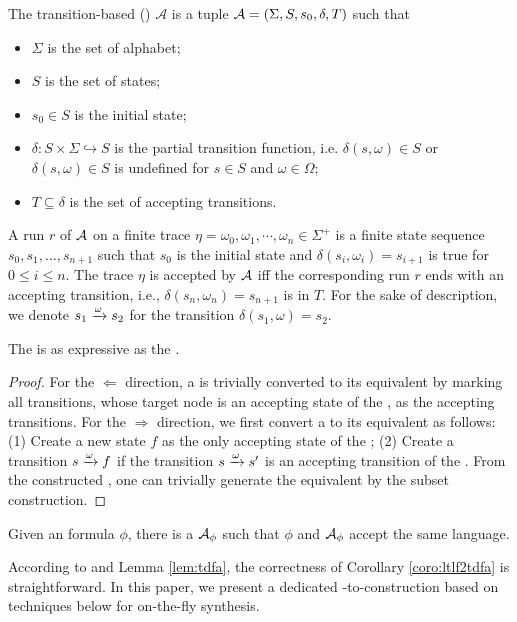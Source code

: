 \begin{definition}\label{def:tdfa}
The transition-based \dfa (\tdfa) $\mathcal{A}$ is a tuple $\mathcal{A} = (\Sigma,S,s_0,\delta,T)$ such that 
\begin{itemize}
    \item $\Sigma$ is the set of alphabet;
    \item $S$ is the set of states;
    \item $s_0\in S$ is the initial state;
    \item $\delta:S\times\Sigma\hookrightarrow S$ is the partial transition function, i.e. $\delta (s, \omega)\in S$ or $\delta (s, \omega)\in S$ is undefined for $s\in S$ and $\omega\in\Omega$;
    \item $T \subseteq \delta$ is the set of accepting transitions.
\end{itemize}
\end{definition}

A run $r$ of $\mathcal{A}$ on a finite trace $\eta=\omega_0, \omega_1,\cdots, \omega_n \in \Sigma^+$ is a finite state sequence $s_0,s_1,\ldots,s_{n+1}$ such that $s_0$ is the initial state and $\delta (s_i, \omega_i) = s_{i+1}$ is true for $0\leq i \leq n$.
The trace $\eta$ is accepted by $\mathcal{A}$ iff the corresponding run $r$ ends with an accepting transition, i.e., $\delta (s_n, \omega_n) = s_{n+1}$ is in $T$. For the sake of description, we denote $s_1\xrightarrow[]{\omega}s_2$ for the transition $\delta (s_1, \omega) = s_2$.

\begin{lemma}\label{lem:tdfa}
The \tdfa is as expressive as the \dfa.
\end{lemma}
\begin{proof}
	For the $\Leftarrow$ direction, a \dfa is trivially converted to its equivalent \tdfa by marking all transitions, whose target node is an accepting state of the \dfa, as the accepting transitions. For the $\Rightarrow$ direction, we first convert a \tdfa to its equivalent \nfa as follows: (1) Create a new state $f$ as the only accepting state of the \nfa; (2) Create a transition $s\xrightarrow[]{\omega}f$ if the transition $s\xrightarrow[]{\omega}s'$ is an accepting transition of the \tdfa. From the constructed \nfa, one can trivially generate the equivalent \dfa by the subset construction. 
\end{proof}

\begin{corollary}\label{coro:ltlf2tdfa}
Given an \ltlf formula $\phi$, there is a \tdfa $\mathcal{A}_{\phi}$ such that $\phi$ and $\mathcal{A}_{\phi}$ accept the same language.
\end{corollary}
According to \cite{GV13} and Lemma \ref{lem:tdfa}, the correctness of Corollary \ref{coro:ltlf2tdfa} is straightforward. In this paper, we present a dedicated \ltlf-to-\tdfa construction based on \SAT techniques below for on-the-fly synthesis. 

